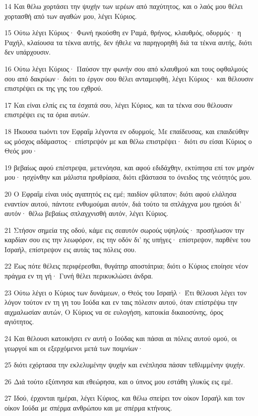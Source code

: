 \par 14 Και θέλω χορτάσει την ψυχήν των ιερέων από παχύτητος, και ο λαός μου θέλει χορτασθή από των αγαθών μου, λέγει Κύριος.
\par 15 Ούτω λέγει Κύριος· Φωνή ηκούσθη εν Ραμά, θρήνος, κλαυθμός, οδυρμός· η Ραχήλ, κλαίουσα τα τέκνα αυτής, δεν ήθελε να παρηγορηθή διά τα τέκνα αυτής, διότι δεν υπάρχουσιν.
\par 16 Ούτω λέγει Κύριος· Παύσον την φωνήν σου από κλαυθμού και τους οφθαλμούς σου από δακρύων· διότι το έργον σου θέλει ανταμειφθή, λέγει Κύριος· και θέλουσιν επιστρέψει εκ της γης του εχθρού.
\par 17 Και είναι ελπίς εις τα έσχατά σου, λέγει Κύριος, και τα τέκνα σου θέλουσιν επιστρέψει εις τα όρια αυτών.
\par 18 Ήκουσα τωόντι τον Εφραΐμ λέγοντα εν οδυρμοίς, Με επαίδευσας, και επαιδεύθην ως μόσχος αδάμαστος· επίστρεψόν με και θέλω επιστρέψει· διότι συ είσαι Κύριος ο Θεός μου·
\par 19 βεβαίως αφού επέστρεψα, μετενόησα, και αφού εδιδάχθην, εκτύπησα επί τον μηρόν μου· ησχύνθην και μάλιστα ηρυθρίασα, διότι εβάστασα το όνειδος της νεότητός μου.
\par 20 Ο Εφραΐμ είναι υιός αγαπητός εις εμέ; παιδίον φίλτατον; διότι αφού ελάλησα εναντίον αυτού, πάντοτε ενθυμούμαι αυτόν, διά τούτο τα σπλάγχνα μου ηχούσι δι' αυτόν· θέλω βεβαίως σπλαγχνισθή αυτόν, λέγει Κύριος.
\par 21 Στήσον σημεία της οδού, κάμε εις σεαυτόν σωρούς υψηλούς· προσήλωσον την καρδίαν σου εις την λεωφόρον, εις την οδόν δι' ης υπήγες· επίστρεψον, παρθένε του Ισραήλ, επίστρεψον εις αυτάς τας πόλεις σου.
\par 22 Έως πότε θέλεις περιφέρεσθαι, θυγάτηρ αποστάτρια; διότι ο Κύριος εποίησε νέον πράγμα εν τη γή· Γυνή θέλει περικυκλώσει άνδρα.
\par 23 Ούτω λέγει ο Κύριος των δυνάμεων, ο Θεός του Ισραήλ· Έτι θέλουσι λέγει τον λόγον τούτον εν τη γη του Ιούδα και εν ταις πόλεσιν αυτού, όταν επίστρέψω την αιχμαλωσίαν αυτών, Ο Κύριος να σε ευλογήση, κατοικία δικαιοσύνης, όρος αγιότητος.
\par 24 Και θέλουσι κατοικήσει εν αυτή ο Ιούδας και πάσαι αι πόλεις αυτού ομού, οι γεωργοί και οι εξερχόμενοι μετά των ποιμνίων·
\par 25 διότι εχόρτασα την εκλελυμένην ψυχήν και ενέπλησα πάσαν τεθλιμμένην ψυχήν.
\par 26 Διά τούτο εξύπνησα και εθεώρησα, και ο ύπνος μου εστάθη γλυκύς εις εμέ.
\par 27 Ιδού, έρχονται ημέραι, λέγει Κύριος, και θέλω σπείρει τον οίκον Ισραήλ και τον οίκον Ιούδα με σπέρμα ανθρώπου και με σπέρμα κτήνους.
